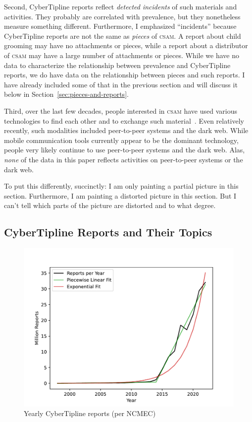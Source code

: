 \documentclass[nonacm,screen]{acmart}
\newcommand\V[1]{\textsc{\MakeLowercase{#1}}}
\begin{document}
Second, CyberTipline reports reflect \emph{detected incidents} of such materials
and activities. They probably are correlated with prevalence, but they
nonetheless measure something different. Furthermore, I emphasized ``incidents''
because CyberTipline reports are not the same as \emph{pieces} of \V{CSAM}. A
report about child grooming may have no attachments or pieces, while a report
about a distributor of \V{CSAM} may have a large number of attachments or
pieces. While we have no data to characterize the relationship between
prevalence and CyberTipline reports, we do have data on the relationship between
pieces and such reports. I have already included some of that in the previous
section and will discuss it below in Section~\ref{sec:pieces-and-reports}.

Third, over the last few decades, people interested in \V{CSAM} have used
various technologies to find each other and to exchange such
material~\cite{SteelNewmanea2020}. Even relatively recently, such modalities
included peer-to-peer systems and the dark web. While mobile communication tools
currently appear to be the dominant technology, people very likely continue to
use peer-to-peer systems and the dark web. Alas, \emph{none} of the data in this
paper reflects activities on peer-to-peer systems or the dark web.

To put this differently, succinctly: I am only painting a partial picture in
this section. Furthermore, I am painting a distorted picture in this section.
But I can't tell which parts of the picture are distorted and to what degree.


\subsection{CyberTipline Reports and Their Topics}
\label{sec:report-contents}

\begin{figure}
\centering
\includegraphics[scale=0.6]{figure/reports-per-year}
\caption{Yearly CyberTipline reports (per NCMEC)}
\label{fig:yearly-reports}
\end{figure}
\end{document}
